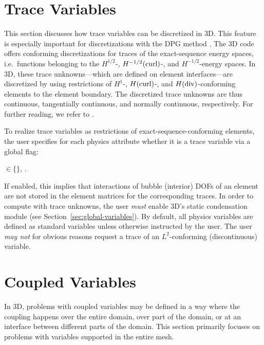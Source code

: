 \section{Trace Variables}
\label{sec:traces}

This section discusses how trace variables can be discretized in \hp3D. This feature is especially important for discretizations with the DPG method \cite{demkowicz2017dpg}. The \hp3D code offers conforming discretizations for traces of the exact-sequence energy spaces, i.e.~functions belonging to the $H^{1/2}$-, $H^{-1/2}(\text{curl})$-, and $H^{-1/2}$-energy spaces. In \hp3D, these trace unknowns---which are defined on element interfaces---are discretized by using restrictions of $H^1$-, $H(\text{curl})$-, and $H(\text{div})$-conforming elements to the element boundary. The discretized trace unknowns are thus continuous, tangentially continuous, and normally continuous, respectively. For further reading, we refer to \cite{demkowicz2018spaces,demkowicz2020fem}.

To realize trace variables as restrictions of exact-sequence-conforming elements, the user specifies for each physics attribute whether it is a trace variable via a global flag:

 $\in \{$$\}$, .

\noindent
If enabled, this implies that interactions of bubble (interior) DOFs of an element are not stored in the element matrices for the corresponding traces. In order to compute with trace unknowns, the user \emph{must} enable \hp3D's static condensation module  (see Section~\ref{sec:global-variables}). By default, all physics variables are defined as standard variables unless otherwise instructed by the user. The user \emph{may not} for obvious reasons request a trace of an $L^2$-conforming (discontinuous) variable.

\section{Coupled Variables}
\label{sec:coupled-variables}

In \hp3D, problems with coupled variables may be defined in a way where the coupling happens over the entire domain, over part of the domain, or at an interface between different parts of the domain. This section primarily focuses on problems with variables supported in the entire mesh.

